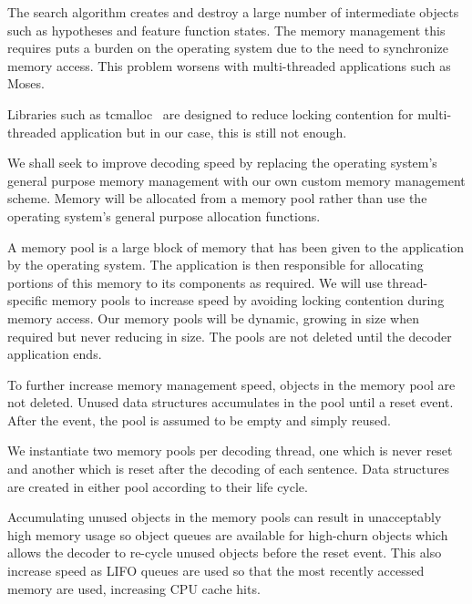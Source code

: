 \documentclass[11pt]{article}
\begin{document}
The search algorithm creates and destroy a large number of intermediate objects such as hypotheses and feature function states. The memory management this requires puts a burden on the operating system due to the need to synchronize memory access. This problem worsens with multi-threaded applications such as Moses.

Libraries such as tcmalloc~\cite{ghemawat2009tcmalloc} are designed to reduce locking contention for multi-threaded application but in our case, this is still not enough. 

We shall seek to improve decoding speed by replacing the operating system's general purpose memory management with our own custom memory management scheme. Memory will be allocated from a memory pool rather than use the operating system's general purpose allocation functions.

A memory pool is a large block of memory that has been given to the application by the operating system. The application is then responsible for allocating portions of this memory to its components as required. We will use thread-specific memory pools to increase speed by avoiding locking contention during memory access. Our memory pools will be dynamic, growing in size when required but never reducing in size. The pools are not deleted until the decoder application ends. 

To further increase memory management speed, objects in the memory pool are not deleted. Unused data structures accumulates in the pool until a reset event. After the event, the pool is assumed to be empty and simply reused. 

We instantiate two memory pools per decoding thread, one which is never reset and another which is reset after the decoding of each sentence. Data structures are created in either pool according to their life cycle.

Accumulating unused objects in the memory pools can result in unacceptably high memory usage so object queues are available for high-churn objects which allows the decoder to re-cycle unused objects before the reset event. This also increase speed as LIFO queues are used so that the most recently accessed memory are used, increasing CPU cache hits.

\end{document}

